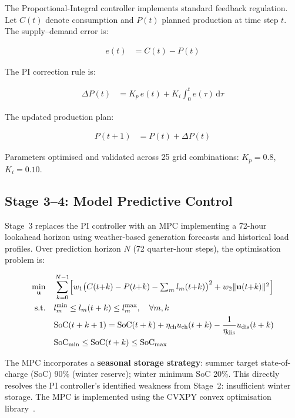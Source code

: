 \documentclass[12pt]{article}
\begin{document}
The Proportional-Integral controller implements standard feedback regulation.
Let $C(t)$ denote consumption and $P(t)$ planned production at time step $t$.
The supply--demand error is:

\begin{align}
  e(t) &= C(t) - P(t) \label{eq:error}
\end{align}

The PI correction rule is:

\begin{align}
  \Delta P(t) &= K_p \, e(t) + K_i \int_0^t e(\tau)\,\mathrm{d}\tau \label{eq:pi}
\end{align}

The updated production plan:

\begin{align}
  P(t+1) &= P(t) + \Delta P(t) \label{eq:update}
\end{align}

Parameters optimised and validated across 25 grid combinations:
$K_p = 0.8$,\; $K_i = 0.10$.

\subsection{Stage 3--4: Model Predictive Control}

Stage~3 replaces the PI controller with an MPC implementing a 72-hour lookahead
horizon using weather-based generation forecasts and historical load profiles.
Over prediction horizon $N$ (72 quarter-hour steps), the optimisation problem is:

\begin{align}
  \min_{\mathbf{u}} \quad &
    \sum_{k=0}^{N-1} \Bigl[
      w_1 \bigl(C(t{+}k) - P(t{+}k) - \textstyle\sum_m l_m(t{+}k)\bigr)^2
      + w_2 \|\mathbf{u}(t{+}k)\|^2
    \Bigr] \label{eq:mpc_obj} \\
  \text{s.t.} \quad
    & l_m^{\min} \le l_m(t+k) \le l_m^{\max}, \quad \forall m, k \label{eq:mpc_bounds} \\
    & \mathrm{SoC}(t+k+1) = \mathrm{SoC}(t+k) + \eta_{\mathrm{ch}} u_{\mathrm{ch}}(t+k)
      - \frac{1}{\eta_{\mathrm{dis}}} u_{\mathrm{dis}}(t+k) \label{eq:soc} \\
    & \mathrm{SoC}_{\min} \le \mathrm{SoC}(t+k) \le \mathrm{SoC}_{\max}
      \label{eq:soc_bounds}
\end{align}

The MPC incorporates a \textbf{seasonal storage strategy}: summer target state-of-charge
(SoC) 90\% (winter reserve); winter minimum SoC 20\%.
This directly resolves the PI controller's identified weakness from Stage~2:
insufficient winter storage.
The MPC is implemented using the CVXPY convex optimisation library~\citep{diamond2016cvxpy}.
\end{document}

